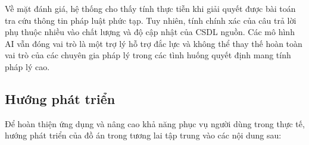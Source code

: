 Về mặt đánh giá,
hệ thống cho thấy tính thực tiễn
khi giải quyết được bài toán tra cứu
thông tin pháp luật phức tạp.
Tuy nhiên, tính chính xác của câu trả lời phụ thuộc nhiều
vào chất lượng và độ cập nhật của CSDL nguồn.
Các mô hình AI vẫn đóng vai trò
là một trợ lý hỗ trợ đắc lực
và không thể thay thế hoàn toàn vai trò của các chuyên gia pháp lý
trong các tình huống quyết định mang tính pháp lý cao.

\subsection*{Hướng phát triển}

Để hoàn thiện ứng dụng
và nâng cao khả năng
phục vụ người dùng trong thực tế,
hướng phát triển của đồ án
trong tương lai tập trung vào các nội dung sau:

